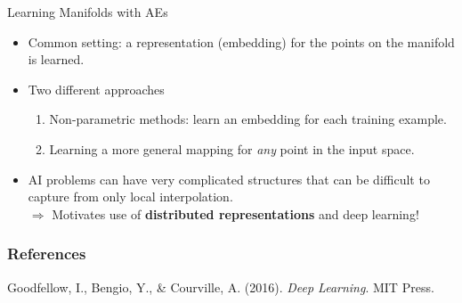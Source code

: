 \begin{vbframe}{Learning Manifolds with AEs}
\begin{itemize}
   \end{itemize}

\framebreak

    \begin{itemize}
        \item Common setting: a representation (embedding) for the points on the manifold is learned.
        \item Two different approaches
            \begin{enumerate}
                \item Non-parametric methods: learn an embedding for each training example.
                \item Learning a more general mapping for \textit{any} point in the input space.
            \end{enumerate}
        \item %
        AI problems can have very complicated structures that can be difficult to capture from only local interpolation.\\
            $\Rightarrow$ Motivates use of \textbf{distributed representations} and deep learning!
    \end{itemize}
\end{vbframe}

\begin{vbframe}
\frametitle{References}
\footnotesize{
\begin{thebibliography}{99}
Goodfellow, I., Bengio, Y., \& Courville, A. (2016). \textit{Deep Learning}. MIT Press.
\end{thebibliography}
}
\end{vbframe}



\endlecture

